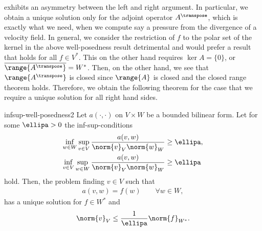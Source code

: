 \begin{remark}
   exhibits an asymmetry
  between the left and right argument. In particular, we obtain a
  unique solution only for the adjoint operator $A^\transpose$, which is
  exactly what we need, when we compute say a pressure from the
  divergence of a velocity field. In general, we consider the
  restriction of $f$ to the polar set of the kernel in the above
  well-posedness result detrimental and would prefer a result that
  holds for all $f\in V^*$. This on the other hand requires
  $\ker A=\{0\}$, or $\overline{\range{A^\transpose}} = W^*$. Then, on the
  other hand, we see that $\range{A^\transpose}$ is closed since $\range{A}$ is
  closed and the closed range theorem holds. Therefore, we obtain the
  following theorem for the case that we require a unique solution for
  all right hand sides.
\end{remark}

\begin{Theorem}{infsup-well-posedness2}
  Let $a(\cdot,\cdot)$ on $V\times W$ be a bounded bilinear form. %
  Let for some $\ellipa>0$ the inf-sup-conditions
  \begin{align}
    \inf_{w\in W}\sup_{v\in V}
    \frac{a(v,w)}{\norm{v}_V\norm{w}_W}
    &\ge \ellipa,\\
    \inf_{v\in V}\sup_{w\in W}
    \frac{a(v,w)}{\norm{v}_V\norm{w}_W}
    &\ge \ellipa
  \end{align}
  hold.  Then, the problem finding $v\in V$ such that
  \begin{gather}
    a(v,w) = f(w) \qquad\forall w\in W,
  \end{gather}
  has a unique solution for $f\in W^*$ and
  \begin{gather}
    \norm{v}_V \le \frac1\ellipa \norm{f}_{W^*}.
  \end{gather}
\end{Theorem}

